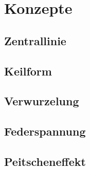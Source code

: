 \section{Konzepte}

\subsection{Zentrallinie}

\subsection{Keilform}

\subsection{Verwurzelung}

\subsection{Federspannung}

\subsection{Peitscheneffekt}